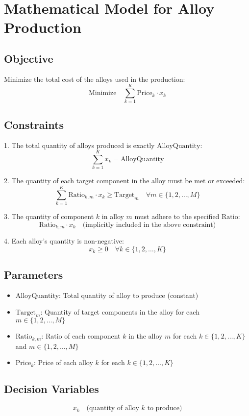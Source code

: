 \documentclass{article}
\begin{document}
\section*{Mathematical Model for Alloy Production}

\subsection*{Objective}
Minimize the total cost of the alloys used in the production:
\[
\text{Minimize} \quad \sum_{k=1}^{K} \text{Price}_k \cdot x_k
\]

\subsection*{Constraints}
1. The total quantity of alloys produced is exactly \(\text{AlloyQuantity}\):
\[
\sum_{k=1}^{K} x_k = \text{AlloyQuantity}
\]

2. The quantity of each target component in the alloy must be met or exceeded:
\[
\sum_{k=1}^{K} \text{Ratio}_{k,m} \cdot x_k \geq \text{Target}_m \quad \forall m \in \{1, 2, \ldots, M\}
\]

3. The quantity of component \(k\) in alloy \(m\) must adhere to the specified \(\text{Ratio}\):
\[
\text{Ratio}_{k,m} \cdot x_k \quad \text{(implicitly included in the above constraint)}
\]

4. Each alloy's quantity is non-negative:
\[
x_k \geq 0 \quad \forall k \in \{1, 2, \ldots, K\}
\]

\subsection*{Parameters}
\begin{itemize}
    \item \(\text{AlloyQuantity}\): Total quantity of alloy to produce (constant)
    \item \(\text{Target}_m\): Quantity of target components in the alloy for each \(m \in \{1, 2, \ldots, M\}\)
    \item \(\text{Ratio}_{k,m}\): Ratio of each component \(k\) in the alloy \(m\) for each \(k \in \{1, 2, \ldots, K\}\) and \(m \in \{1, 2, \ldots, M\}\)
    \item \(\text{Price}_k\): Price of each alloy \(k\) for each \(k \in \{1, 2, \ldots, K\}\)
\end{itemize}

\subsection*{Decision Variables}
\[
x_k \quad \text{(quantity of alloy } k \text{ to produce)}
\]
\end{document}
